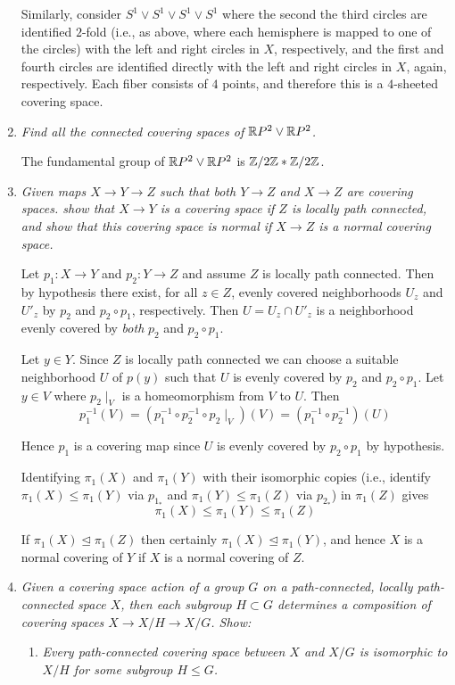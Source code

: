 \documentclass[10pt]{article}
\begin{document}
\begin{enumerate}
Similarly, consider $S^1 \vee S^1 \vee S^1 \vee S^1$ where the second the third circles are identified $2$-fold (i.e., as above, where each hemisphere is mapped to one of the circles) with the left and right circles in $X$, respectively, and the first and fourth circles are identified directly with the left and right circles in $X$, again, respectively.  Each fiber consists of $4$ points, and therefore this is a $4$-sheeted covering space.

\item \emph{Find all the connected covering spaces of $\mathbb{R} P^2 \vee \mathbb{R} P^2$.}

The fundamental group of $\mathbb{R} P^2 \vee \mathbb{R} P^2$ is $\mathbb{Z}/2\mathbb{Z} \ast \mathbb{Z}/2\mathbb{Z}$.

\item \emph{Given maps $X \rightarrow Y \rightarrow Z$ such that both $Y \rightarrow Z$ and $X \rightarrow Z$ are covering spaces. show that $X \rightarrow Y$ is a covering space if $Z$ is locally path connected, and show that this covering space is normal if $X \rightarrow Z$ is a normal covering space.}

Let $p_1 : X \rightarrow Y$ and $p_2: Y \rightarrow Z$ and assume $Z$ is locally path connected.  Then by hypothesis there exist, for all $z \in Z$, evenly covered neighborhoods $U_z$ and $U'_z$ by $p_2$ and $p_2 \circ p_1$, respectively.  Then $U = U_z \cap U'_z$ is a neighborhood evenly covered by \emph{both} $p_2$ and $p_2 \circ p_1$.

Let $y \in Y$.  Since $Z$ is locally path connected we can choose a suitable neighborhood $U$ of $p(y)$ such that $U$ is evenly covered by $p_2$ and $p_2 \circ p_1$.  Let $y \in V$ where $p_2 \mid_V$ is a homeomorphism from $V$ to $U$.  Then
\[
p_1^{-1}(V) = \left(p_1^{-1} \circ p_2^{-1} \circ p_2 \mid_V \right)(V) =  \left(p_1^{-1} \circ p_2^{-1}\right)(U)
\]

Hence $p_1$ is a covering map since $U$ is evenly covered by $p_2 \circ p_1$ by hypothesis.

Identifying $\pi_1(X)$ and $\pi_1(Y)$ with their isomorphic copies (i.e., identify $\pi_1(X) \leq \pi_1(Y)$ via $p_{1_\ast}$ and $\pi_1(Y) \leq \pi_1(Z)$ via $p_{2_\ast}$) in $\pi_1(Z)$ gives
\[
\pi_1(X) \leq \pi_1(Y) \leq \pi_1(Z)
\]

If $\pi_1(X) \unlhd \pi_1(Z)$ then certainly $\pi_1(X) \unlhd \pi_1(Y)$, and hence $X$ is a normal covering of $Y$ if $X$ is a normal covering of $Z$.

\item \emph{Given a covering space action of a group $G$ on a path-connected, locally path-connected space $X$, then each subgroup $H \subset G$ determines a composition of covering spaces $X \rightarrow X/H \rightarrow X/G$.  Show:}
\begin{enumerate}
\item \emph{Every path-connected covering space between $X$ and $X/G$ is isomorphic to $X/H$ for some subgroup $H \leq G$.}



\end{enumerate}
\end{enumerate}
\end{document}
